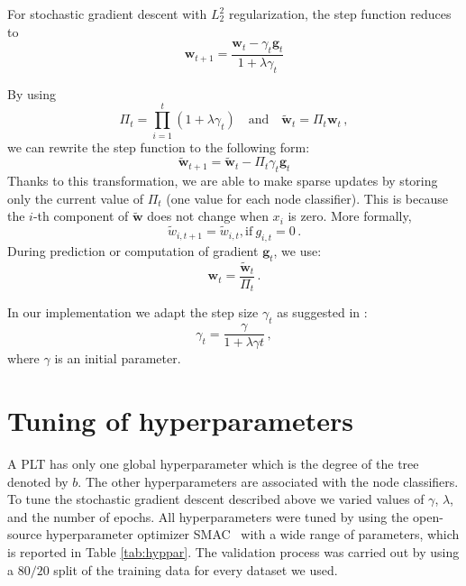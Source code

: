 \documentclass{article}
\newcommand{\Algo}[1]{\textsc{#1}}
\renewcommand{\vec}[1]{\boldsymbol{#1}}
\newcommand{\bw}{\vec{w}}
\begin{document}
For stochastic gradient descent with $L_2^2$ regularization,
the step function reduces to
\begin{equation*}\label{eq:fobosl2}
	\bm{w}_{t+1} = \frac{\bm{w}_t - \gamma_t \bm{g}_t}{1 + \lambda\gamma_{t}}
\end{equation*}

By using  
$$
\Pi_t = \prod_{i=1}^t (1 + \lambda\gamma_{t}) 
\quad \mathrm{and} \quad \tilde{\bw}_t = \Pi_{t} \bw_t \,,
$$
we can rewrite the step function to the following form:
$$
\tilde{\bw}_{t+1}  = \tilde{\bw}_t - \Pi_{t}  \gamma_t \bm{g}_t
$$
Thanks to this transformation, we are able to make sparse updates by storing only the current value of $\Pi_t$ (one value for each node classifier). This is because the $i$-th component of $\tilde{\bw}$ does not change when $x_i$ is zero. More formally, 
$$
\tilde{w}_{i,t+1}  = \tilde{w}_{i,t} \mathrm{, if~} g_{i,t} = 0 \,.
$$
During prediction or computation of gradient $\bm{g}_t$, we use:
$$
\bw_t = \frac{\tilde{\bw}_{t}}{\Pi_{t}} \,.
$$

In our implementation we adapt the step size $\gamma_t$ as suggested in \citep{Bottou_2012}:
$$
\gamma_t = \frac{\gamma}{1 + \lambda \gamma t} \,,
$$
where $\gamma$ is an initial parameter.


\section{Tuning of hyperparameters}
\label{sec:hyper}


A \Algo{PLT} has only one global hyperparameter which is the degree of the tree denoted by $b$. The other hyperparameters are associated with the node classifiers. To tune the stochastic gradient descent described above we varied values of $\gamma$, $\lambda$, and the number of epochs. 
%
All hyperparameters were tuned by using the open-source hyperparameter optimizer \Algo{SMAC}~\cite{Hutter_et_al_2011} with a wide range of parameters, which is reported in Table \ref{tab:hyppar}. 
The validation process was carried out by using a $80/20$ split of the training data for every dataset we used.
\end{document}
